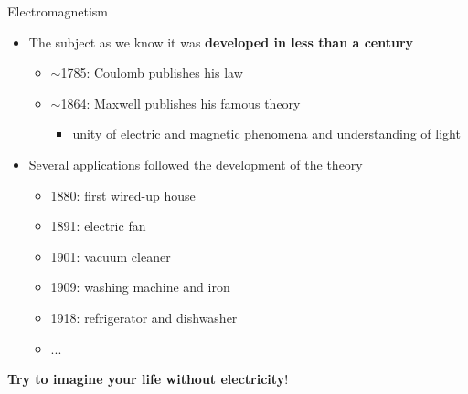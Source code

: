 \begin{frame}{Electromagnetism}

\begin{itemize}

   \item The subject as we know it was {\bf developed in less than a century}
   \begin{itemize}
      \item $\sim$1785: Coulomb publishes his law
      \item $\sim$1864: Maxwell publishes his famous theory
        \begin{itemize}
            \item unity of electric and magnetic phenomena and understanding of light
        \end{itemize}
   \end{itemize}

   \item Several applications followed the development of the theory
   \begin{itemize}
     \item 1880: first wired-up house
     \item 1891: electric fan
     \item 1901: vacuum cleaner
     \item 1909: washing machine and iron
     \item 1918: refrigerator and dishwasher
     \item ...
   \end{itemize}
\end{itemize}

\begin{center}
  {\bf Try to imagine your life without electricity}!
\end{center}

\end{frame}

%
%
%


